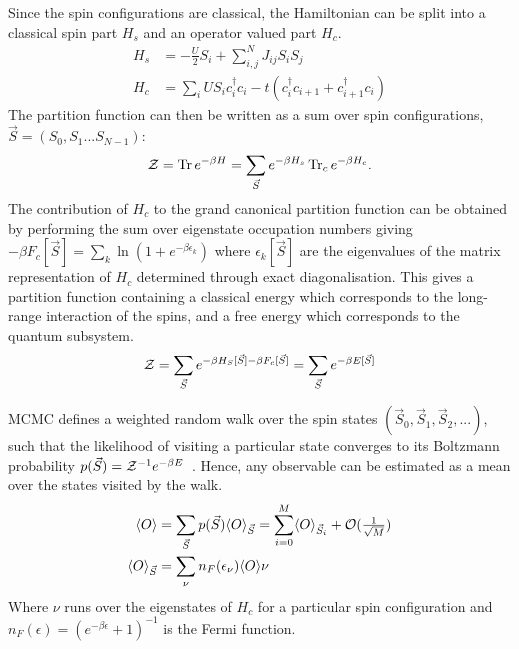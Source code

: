 Since the spin configurations are classical, the Hamiltonian can be split into a classical spin part \(H_s\) and an operator valued part \(H_c\). \[\begin{aligned}
H_s& = - \frac{U}{2}S_i + \sum_{i, j}^{N} J_{ij} S_i S_j \\
H_c& = \sum_i U S_i c^\dag_{i}c_{i} -t(c^\dag_{i}c_{i+1} + c^\dag_{i+1}c_{i}) \end{aligned}\] The partition function can then be written as a sum over spin configurations, \(\vec{S} = (S_0, S_1...S_{N-1})\): \[\begin{aligned}
\mathcal{Z} = \Tr e^{-\beta H}= \sum_{\vec{S}} e^{-\beta H_s} \Tr_c e^{-\beta H_c} .\end{aligned}\] The contribution of \(H_c\) to the grand canonical partition function can be obtained by performing the sum over eigenstate occupation numbers giving \(-\beta F_c[\vec{S}] = \sum_k \ln{(1 + e^{- \beta \epsilon_k})}\) where \({\epsilon_k[\vec{S}]}\) are the eigenvalues of the matrix representation of \(H_c\) determined through exact diagonalisation. This gives a partition function containing a classical energy which corresponds to the long-range interaction of the spins, and a free energy which corresponds to the quantum subsystem. \[\begin{aligned}
\mathcal{Z} = \sum_{\vec{S}} e^{-\beta H_S[\vec{S}] - \beta F_c[\vec{S}]} = \sum_{\vec{S}} e^{-\beta E[\vec{S}]}\end{aligned}\]

{MCMC} defines a weighted random walk over the spin states \((\vec{S}_0, \vec{S}_1, \vec{S}_2, ...)\), such that the likelihood of visiting a particular state converges to its Boltzmann probability \(p(\vec{S}) = \mathcal{Z}^{-1} e^{-\beta E}\)~\autocite{binderGuidePracticalWork1988,kerteszAdvancesComputerSimulation1998,wolffMonteCarloErrors2004}. Hence, any observable can be estimated as a mean over the states visited by the walk. \[\begin{aligned}
 \label{eq:thermal_expectation}
\langle O \rangle& = \sum_{\vec{S}} p(\vec{S}) \langle O \rangle_{\vec{S}} = \sum_{i = 0}^{M} \langle O \rangle_{\vec{S}_i} + \mathcal{O}(\tfrac{1}{\sqrt{M}})\\
\langle O \rangle_{\vec{S}}& = \sum_{\nu} n_F(\epsilon_{\nu}) \langle O \rangle{\nu}\end{aligned}\] Where \(\nu\) runs over the eigenstates of \(H_c\) for a particular spin configuration and \(n_F(\epsilon) = \left(e^{-\beta\epsilon} + 1\right)^{-1}\) is the Fermi function.

